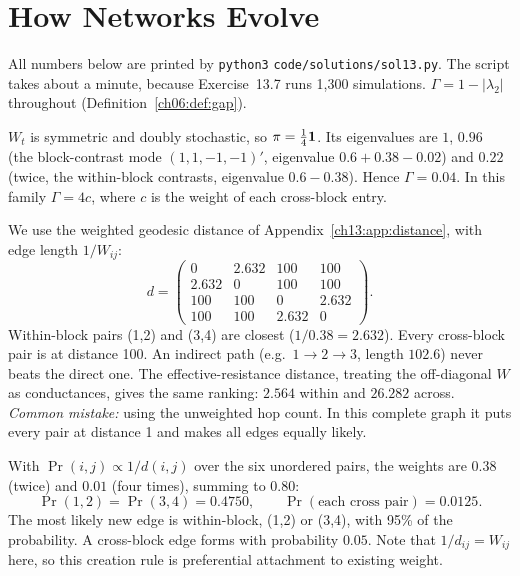 \documentclass[../solutions_manual.tex]{subfiles}
\begin{document}
\ifSubfilesClassLoaded{\setcounter{chapter}{12}}{}%
\setcounter{chapter}{12}%
\chapter{How Networks Evolve}\label{sol13}
\sloppy

All numbers below are printed by \texttt{python3} \nolinkurl{code/solutions/sol13.py}. The script takes about a minute, because Exercise~13.7 runs 1,300 simulations. $\Gamma = 1 - |\lambda_2|$ throughout (Definition~\ref{ch06:def:gap}).

$W_t$ is symmetric and doubly stochastic, so $\pi = \frac14\mathbf{1}$. Its eigenvalues are $1$, $0.96$ (the block-contrast mode $(1,1,-1,-1)'$, eigenvalue $0.6 + 0.38 - 0.02$) and $0.22$ (twice, the within-block contrasts, eigenvalue $0.6 - 0.38$). Hence $\Gamma = 0.04$. In this family $\Gamma = 4c$, where $c$ is the weight of each cross-block entry.

 We use the weighted geodesic distance of Appendix~\ref{ch13:app:distance}, with edge length $1/W_{ij}$:
\[
d = \begin{pmatrix} 0 & 2.632 & 100 & 100 \\ 2.632 & 0 & 100 & 100 \\ 100 & 100 & 0 & 2.632 \\ 100 & 100 & 2.632 & 0 \end{pmatrix}.
\]
Within-block pairs (1,2) and (3,4) are closest ($1/0.38 = 2.632$). Every cross-block pair is at distance 100. An indirect path (e.g.\ $1\to 2\to 3$, length $102.6$) never beats the direct one. The effective-resistance distance, treating the off-diagonal $W$ as conductances, gives the same ranking: $2.564$ within and $26.282$ across. \textit{Common mistake:} using the unweighted hop count. In this complete graph it puts every pair at distance 1 and makes all edges equally likely.

 With $\Pr(i,j) \propto 1/d(i,j)$ over the six unordered pairs, the weights are $0.38$ (twice) and $0.01$ (four times), summing to $0.80$:
\[
\Pr(1,2) = \Pr(3,4) = 0.4750, \qquad \Pr(\text{each cross pair}) = 0.0125 .
\]
The most likely new edge is within-block, (1,2) or (3,4), with 95\% of the probability. A cross-block edge forms with probability $0.05$. Note that $1/d_{ij} = W_{ij}$ here, so this creation rule is preferential attachment to existing weight.
\end{document}
